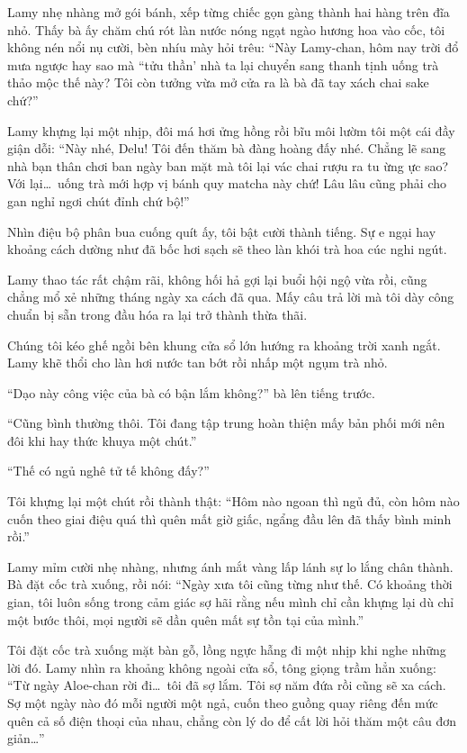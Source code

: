 \documentclass[../main.tex]{subfiles}
\begin{document}
Lamy nhẹ nhàng mở gói bánh, xếp từng chiếc gọn gàng thành hai hàng trên đĩa nhỏ. Thấy bà ấy chăm chú rót làn nước nóng ngạt ngào hương hoa vào cốc, tôi không nén nổi nụ cười, bèn nhíu mày hỏi trêu: ``Này Lamy-chan, hôm nay trời đổ mưa ngược hay sao mà ``tửu thần' nhà ta lại chuyển sang thanh tịnh uống trà thảo mộc thế này? Tôi còn tưởng vừa mở cửa ra là bà đã tay xách chai sake chứ?''

Lamy khựng lại một nhịp, đôi má hơi ửng hồng rồi bĩu môi lườm tôi một cái đầy giận dỗi: ``Này nhé, Delu! Tôi đến thăm bà đàng hoàng đấy nhé. Chẳng lẽ sang nhà bạn thân chơi ban ngày ban mặt mà tôi lại vác chai rượu ra tu ừng ực sao? Với lại\dots\ uống trà mới hợp vị bánh quy matcha này chứ! Lâu lâu cũng phải cho gan nghỉ ngơi chút đỉnh chứ bộ!''

Nhìn điệu bộ phân bua cuống quít ấy, tôi bật cười thành tiếng. Sự e ngại hay khoảng cách dường như đã bốc hơi sạch sẽ theo làn khói trà hoa cúc nghi ngút.

Lamy thao tác rất chậm rãi, không hối hả gợi lại buổi hội ngộ vừa rồi, cũng chẳng mổ xẻ những tháng ngày xa cách đã qua. Mấy câu trả lời mà tôi dày công chuẩn bị sẵn trong đầu hóa ra lại trở thành thừa thãi.

\ct

Chúng tôi kéo ghế ngồi bên khung cửa sổ lớn hướng ra khoảng trời xanh ngắt. Lamy khẽ thổi cho làn hơi nước tan bớt rồi nhấp một ngụm trà nhỏ.

``Dạo này công việc của bà có bận lắm không?'' bà lên tiếng trước.

``Cũng bình thường thôi. Tôi đang tập trung hoàn thiện mấy bản phối mới nên đôi khi hay thức khuya một chút.''

``Thế có ngủ nghê tử tế không đấy?''

Tôi khựng lại một chút rồi thành thật: ``Hôm nào ngoan thì ngủ đủ, còn hôm nào cuốn theo giai điệu quá thì quên mất giờ giấc, ngẩng đầu lên đã thấy bình minh rồi.''

Lamy mỉm cười nhẹ nhàng, nhưng ánh mắt vàng lấp lánh sự lo lắng chân thành. Bà đặt cốc trà xuống, rồi nói: ``Ngày xưa tôi cũng từng như thế. Có khoảng thời gian, tôi luôn sống trong cảm giác sợ hãi rằng nếu mình chỉ cần khựng lại dù chỉ một bước thôi, mọi người sẽ dần quên mất sự tồn tại của mình.''

Tôi đặt cốc trà xuống mặt bàn gỗ, lồng ngực hẫng đi một nhịp khi nghe những lời đó. Lamy nhìn ra khoảng không ngoài cửa sổ, tông giọng trầm hẳn xuống: ``Từ ngày Aloe-chan rời đi\dots\ tôi đã sợ lắm. Tôi sợ năm đứa rồi cũng sẽ xa cách. Sợ một ngày nào đó mỗi người một ngả, cuốn theo guồng quay riêng đến mức quên cả số điện thoại của nhau, chẳng còn lý do để cất lời hỏi thăm một câu đơn giản\dots''
\end{document}
